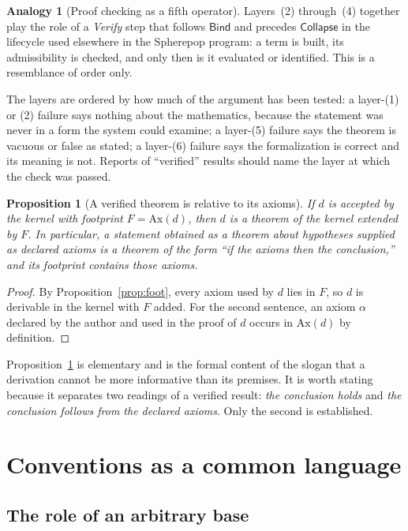 \documentclass[11pt]{article}
\newcommand{\Bind}{\mathsf{Bind}}
\newcommand{\Coll}{\mathsf{Collapse}}
\theoremstyle{definition}
\newtheorem{analogy}[definition]{Analogy}
\theoremstyle{plain}
\newtheorem{proposition}[definition]{Proposition}
\theoremstyle{remark}
\begin{document}
\begin{analogy}[Proof checking as a fifth operator]\label{an:verify}
Layers~(2) through~(4) together play the role of a \emph{Verify} step that follows $\Bind$ and precedes $\Coll$ in the lifecycle used elsewhere in the Spherepop program: a term is built, its admissibility is checked, and only then is it evaluated or identified. This is a resemblance of order only.
\end{analogy}

The layers are ordered by how much of the argument has been tested: a layer-(1) or (2) failure says nothing about the mathematics, because the statement was never in a form the system could examine; a layer-(5) failure says the theorem is vacuous or false as stated; a layer-(6) failure says the formalization is correct and its meaning is not. Reports of ``verified'' results should name the layer at which the check was passed.

\begin{proposition}[A verified theorem is relative to its axioms]\label{prop:relative}
If $d$ is accepted by the kernel with footprint $F=\mathrm{Ax}(d)$, then $d$ is a theorem of the kernel extended by $F$. In particular, a statement obtained as a theorem about hypotheses supplied as declared axioms is a theorem of the form ``if the axioms then the conclusion,'' and its footprint contains those axioms.
\end{proposition}
\begin{proof}
By Proposition~\ref{prop:foot}, every axiom used by $d$ lies in $F$, so $d$ is derivable in the kernel with $F$ added. For the second sentence, an axiom $\alpha$ declared by the author and used in the proof of $d$ occurs in $\mathrm{Ax}(d)$ by definition.
\end{proof}

Proposition~\ref{prop:relative} is elementary and is the formal content of the slogan that a derivation cannot be more informative than its premises. It is worth stating because it separates two readings of a verified result: \emph{the conclusion holds} and \emph{the conclusion follows from the declared axioms}. Only the second is established.
\section{Conventions as a common language}\label{sec:convention}

\subsection{The role of an arbitrary base}
\end{document}
